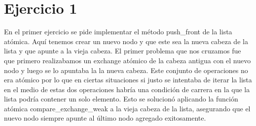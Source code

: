 \section{Ejercicio 1}
En el primer ejercicio se pide implementar el método push\_front de la lista atómica. Aquí tenemos crear un nuevo nodo y que este sea la nueva cabeza de la lista y que apunte a la vieja cabeza. El primer problema que nos cruzamos fue que primero realizabamos un exchange atómico de la cabeza antigua con el nuevo nodo y luego se lo apuntaba la la nueva cabeza. Este conjunto de operaciones no era atómico por lo que en ciertas situaciones si justo se intentaba de iterar la lista en el medio de estas dos operaciones habría una condición de carrera en la que la lista podría contener un solo elemento. Esto se solucionó aplicando la función atómica compare\_exchange\_weak a la vieja cabeza de la lista, asegurando que el nuevo nodo siempre apunte al último nodo agregado exitosamente.
